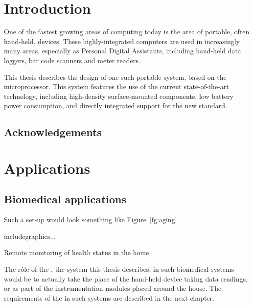 \documentclass[final]{unswthesis}
\begin{document}
\frontmatter

\maketitle
\tableofcontents
\listoffigures
\listoftables

\mainmatter

\chapter{Introduction}\label{ch:intro}

One of the fastest growing areas of computing today is the area of
portable, often hand-held, devices.  These highly-integrated computers
are used in increasingly many areas, especially as Personal Digital
Assistants, including hand-held data loggers, bar code scanners and meter
readers.

This thesis describes the design of one such portable system, based on
the \Elan microprocessor.  This system features the use of the current
state-of-the-art technology, including high-density surface-mounted
components, low battery power consumption, and directly integrated
support for the new \PCMCIA standard.

\section*{Acknowledgements}

\chapter{Applications}\label{ch:apps}

\section{Biomedical applications}

Such a set-up would look something like Figure~\ref{fg:aging}.
%
\begin{ourfigure}
includegraphics...
\caption{Remote monitoring of health status in the home}\label{fg:aging}
\end{ourfigure}

The r\^ole of the \EPC, the system this thesis describes, in such
biomedical systems would be to actually take the place of the hand-held
device taking data readings, or as part of the instrumentation modules
placed around the house.  The requirements of the \EPC in such systems
are described in the next chapter.
\end{document}
